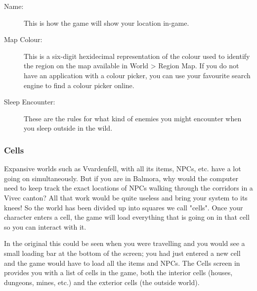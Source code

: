 \begin{description}
 \item[Name:] This is how the game will show your location in-game.
 \item[Map Colour:] This is a six-digit hexidecimal representation of the colour used to identify the region on the map available in
 World > Region Map. If you do not have an application with a colour picker, you can use your favourite search engine to find a colour picker online.
 \item[Sleep Encounter:] These are the rules for what kind of enemies you might encounter when you sleep outside in the wild.
\end{description}

\subsubsection{Cells}
Expansive worlds such as Vvardenfell, with all its items, NPCs, etc. have a lot going on simultaneously. But if you are in Balmora,
why would the computer need to keep track the exact locations of NPCs walking through the corridors in a Vivec canton? All that work would
be quite useless and bring your system to its knees! So the world has been divided up into squares we call "cells". Once your character enters a cell,
the game will load everything that is going on in that cell so you can interact with it.

In the original \MW{} this could be seen when you were travelling and you would see a small loading bar at the bottom of the screen;
you had just entered a new cell and the game would have to load all the items and NPCs. The Cells screen in \OCS{} provides you with a list of cells
in the game, both the interior cells (houses, dungeons, mines, etc.) and the exterior cells (the outside world).

